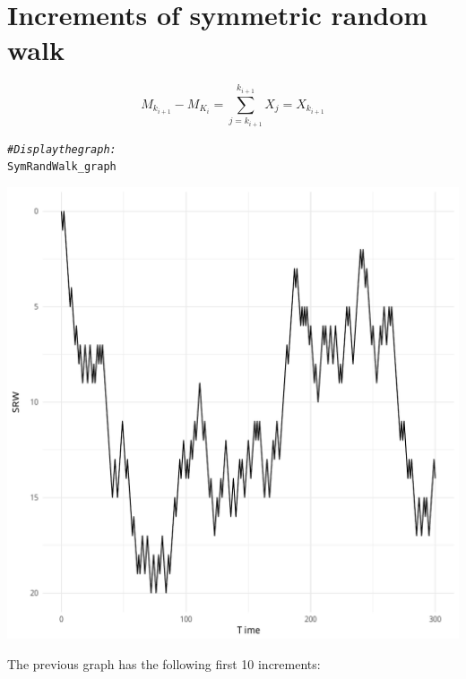 \documentclass{article}\usepackage[]{graphicx}\usepackage[]{color}
\makeatletter
\def\maxwidth{ %
  \ifdim\Gin@nat@width>\linewidth
    \linewidth
  \else
    \Gin@nat@width
  \fi
}
\newcommand{\hlcom}[1]{\textcolor[rgb]{0.678,0.584,0.686}{\textit{#1}}}%
\newcommand{\hlstd}[1]{\textcolor[rgb]{0.345,0.345,0.345}{#1}}%
\newenvironment{kframe}{%
 \def\at@end@of@kframe{}%
 \ifinner\ifhmode%
  \def\at@end@of@kframe{\end{minipage}}%
  \begin{minipage}{\columnwidth}%
 \fi\fi%
 \def\FrameCommand##1{\hskip\@totalleftmargin \hskip-\fboxsep
 \colorbox{shadecolor}{##1}\hskip-\fboxsep
     \hskip-\linewidth \hskip-\@totalleftmargin \hskip\columnwidth}%
 \MakeFramed {\advance\hsize-\width
   \@totalleftmargin\z@ \linewidth\hsize
   \@setminipage}}%
 {\par\unskip\endMakeFramed%
 \at@end@of@kframe}
\newenvironment{knitrout}{}{} %
\makeatother
\begin{document}
\section{Increments of symmetric random walk}
\begin{equation}
M_{k_{i+1}} - M_{K_i} = \sum_{j = k_{i+1}}^{k_{i+1}} X_j = X_{k_{i+1}}
\end{equation}



\begin{knitrout}
\color{fgcolor}\begin{kframe}
\begin{alltt}
\hlcom{# Display the graph:}
\hlstd{SymRandWalk_graph}
\end{alltt}
\end{kframe}
\includegraphics[width=\maxwidth]{figure/unnamed-chunk-10-1} 

\end{knitrout}

The previous graph has the following first 10 increments:
\end{document}
